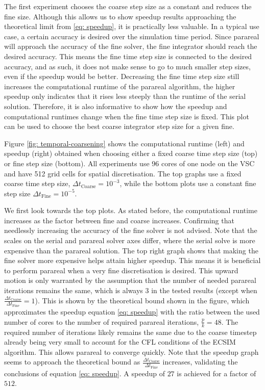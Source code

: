 The first experiment chooses the coarse step size as a constant and reduces the fine size. Although this allows us to show speedup results approaching the theoretical limit from \ref{eq: speedup}, it is practically less valuable. In a typical use case, a certain accuracy is desired over the simulation time period. Since parareal will approach the accuracy of the fine solver, the fine integrator should reach the desired accuracy. This means the fine time step size is connected to the desired accuracy, and as such, it does not make sense to go to much smaller step sizes, even if the speedup would be better. Decreasing the fine time step size still increases the computational runtime of the parareal algorithm, the higher speedup only indicates that it rises less steeply than the runtime of the serial solution. Therefore, it is also informative to show how the speedup and computational runtimes change when the fine time step size is fixed. This plot can be used to choose the best coarse integrator step size for a given fine.

Figure \ref{fig: temporal-coarsening} shows the computational runtime (left) and speedup (right) obtained when choosing either a fixed coarse time step size (top) or fine step size (bottom). All experiments use 96 cores of one node on the VSC and have 512 grid cells for spatial discretisation. The top graphs use a fixed coarse time step size, $\Delta t_\mathrm{Coarse} = 10^{-3}$, while the bottom plots use a constant fine step size $\Delta t_\mathrm{Fine} = 10^{-5}$. 

We first look towards the top plots. As stated before, the computational runtime increases as the factor between fine and coarse increases. Confirming that needlessly increasing the accuracy of the fine solver is not advised. Note that the scales on the serial and parareal solver axes differ, where the serial solve is more expensive than the parareal solution. 
The top right graph shows that making the fine solver more expensive helps attain higher speedup. This means it is beneficial to perform parareal when a very fine discretisation is desired. This upward motion is only warranted by the assumption that the number of needed parareal iterations remains the same, which is always $3$ in the tested results (except when $\frac{\Delta t_\mathrm{Coarse}}{\Delta t_\mathrm{Fine}}=1$). This is shown by the theoretical bound shown in the figure, which approximates the speedup equation \ref{eq: speedup} with the ratio between the used number of cores to the number of required parareal iterations, $\frac{p}{k} = 48$. The required number of iterations likely remains the same due to the coarse timestep already being very small to account for the CFL conditions of the ECSIM algorithm. This allows parareal to converge quickly. Note that the speedup graph seems to approach the theoretical bound as $\frac{\Delta t_\mathrm{Coarse}}{\Delta t_\mathrm{Fine}}$ increases, validating the conclusions of equation \ref{eq: speedup}. A speedup of $27$ is achieved for a factor of $512$.

